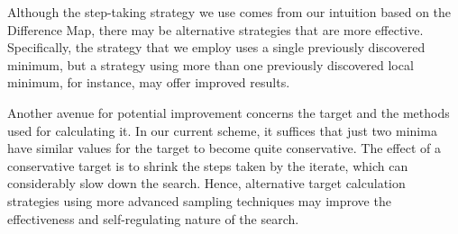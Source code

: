\documentclass[12pt]{article}
\begin{document}
Although the step-taking strategy we use comes from our intuition based on
the Difference Map, there may be alternative strategies that are more
effective. Specifically, the strategy that we employ uses a single
previously discovered minimum, but a strategy using more than one previously
discovered local minimum, for instance, may offer improved results.

Another avenue for potential improvement concerns the target and the methods
used for calculating it. In our current scheme, it suffices that just two
minima have similar values for the target to become quite conservative. The
effect of a conservative target is to shrink the steps taken by the iterate,
which can considerably slow down the search. Hence, alternative target
calculation strategies using more advanced sampling techniques may improve
the effectiveness and self-regulating nature of the search.

\pagebreak



\end{document}
